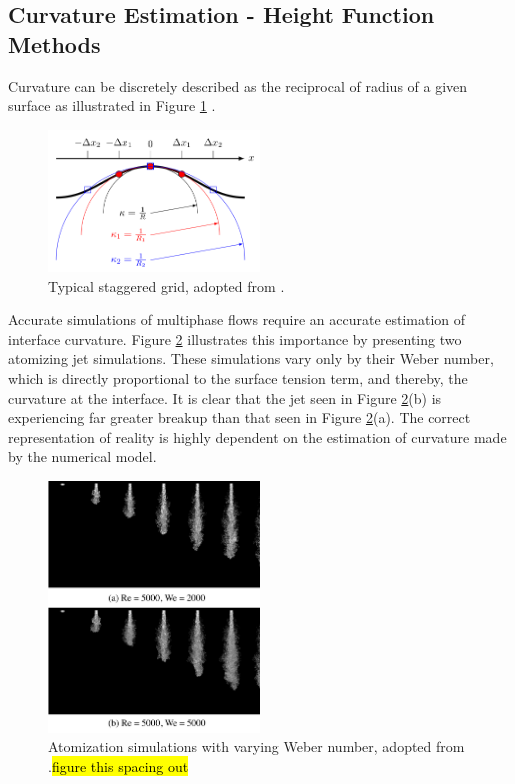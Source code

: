 \subsection{Curvature Estimation - Height Function Methods}

Curvature can be discretely described as the reciprocal of radius of a given surface as illustrated in Figure \ref{fig:curv} \cite{MARK2013}. 

 \begin{figure}[htbp]
	\centering
	\includegraphics[width=0.5\textwidth]{figs/curv}
	\caption{Typical staggered grid, adopted from \cite{TRYG}.}
	\label{fig:curv}
\end{figure}

\noindent {}Accurate simulations of multiphase flows require an accurate estimation of interface curvature. Figure \ref{fig:surf} illustrates this importance by presenting two atomizing jet simulations. These simulations vary only by their Weber number, which is directly proportional to the surface tension term, and thereby, the curvature at the interface. It is clear that the jet seen in Figure \ref{fig:surf}(b) is experiencing far greater breakup than that seen in Figure \ref{fig:surf}(a). The correct representation of reality is highly dependent on the estimation of curvature made by the numerical model. 

 \begin{figure}[htbp]
	\centering
	\includegraphics[width=0.5\textwidth]{figs/surf}
	\caption{Atomization simulations with varying Weber number, adopted from \cite{Desjardins13}.\hl{figure this spacing out}}
	\label{fig:surf}
\end{figure}

